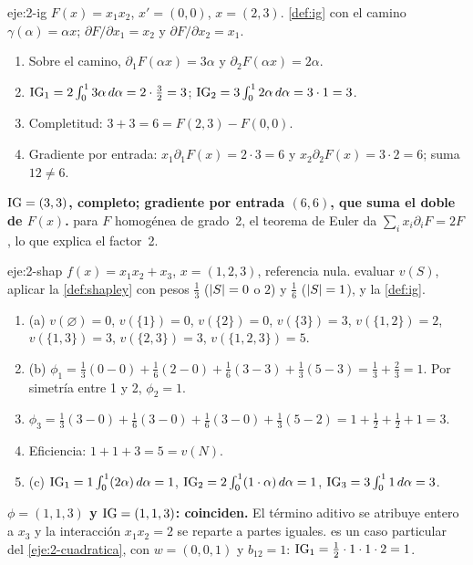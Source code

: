 \begin{solucion}{eje:2-ig}
\datos $F(x)=x_1x_2$, $x'=(0,0)$, $x=(2,3)$.
\planteamiento \cref{def:ig} con el camino $\gamma(\alpha)=\alpha x$; $\partial F/\partial x_1=x_2$ y $\partial F/\partial x_2=x_1$.
\pasos
\begin{enumerate}[label=\arabic*.]
  \item Sobre el camino, $\partial_1F(\alpha x)=3\alpha$ y $\partial_2F(\alpha x)=2\alpha$.
  \item $\operatorname{IG}_1=2\int_0^13\alpha\,d\alpha=2\cdot\tfrac32=3$; $\operatorname{IG}_2=3\int_0^12\alpha\,d\alpha=3\cdot 1=3$.
  \item Completitud: $3+3=6=F(2,3)-F(0,0)$.
  \item Gradiente por entrada: $x_1\partial_1F(x)=2\cdot 3=6$ y $x_2\partial_2F(x)=3\cdot 2=6$; suma $12\neq 6$.
\end{enumerate}
\resultado \textbf{$\operatorname{IG}=(3,3)$, completo; gradiente por entrada $(6,6)$, que suma el doble de $F(x)$.}
\comprobacion para $F$ homogénea de grado~2, el teorema de Euler da $\sum_ix_i\partial_iF=2F$, lo que explica el factor~2.
\end{solucion}

\begin{solucion}{eje:2-shap}
\datos $f(x)=x_1x_2+x_3$, $x=(1,2,3)$, referencia nula.
\planteamiento evaluar $v(S)$, aplicar la \cref{def:shapley} con pesos $\tfrac13$ ($\lvert S\rvert=0$ o $2$) y $\tfrac16$ ($\lvert S\rvert=1$), y la \cref{def:ig}.
\pasos
\begin{enumerate}[label=\arabic*.]
  \item (a) $v(\varnothing)=0$, $v(\{1\})=0$, $v(\{2\})=0$, $v(\{3\})=3$, $v(\{1,2\})=2$, $v(\{1,3\})=3$, $v(\{2,3\})=3$, $v(\{1,2,3\})=5$.
  \item (b) $\phi_1=\tfrac13(0-0)+\tfrac16(2-0)+\tfrac16(3-3)+\tfrac13(5-3)=\tfrac13+\tfrac23=1$. Por simetría entre 1 y 2, $\phi_2=1$.
  \item $\phi_3=\tfrac13(3-0)+\tfrac16(3-0)+\tfrac16(3-0)+\tfrac13(5-2)=1+\tfrac12+\tfrac12+1=3$.
  \item Eficiencia: $1+1+3=5=v(N)$.
  \item (c) $\operatorname{IG}_1=1\int_0^1(2\alpha)\,d\alpha=1$, $\operatorname{IG}_2=2\int_0^1(1\cdot\alpha)\,d\alpha=1$, $\operatorname{IG}_3=3\int_0^11\,d\alpha=3$.
\end{enumerate}
\resultado \textbf{$\phi=(1,1,3)$ y $\operatorname{IG}=(1,1,3)$: coinciden.} El término aditivo se atribuye entero a $x_3$ y la interacción $x_1x_2=2$ se reparte a partes iguales.
\comprobacion es un caso particular del \cref{eje:2-cuadratica}, con $w=(0,0,1)$ y $b_{12}=1$: $\operatorname{IG}_1=\tfrac12\cdot 1\cdot 1\cdot 2=1$.
\end{solucion}

